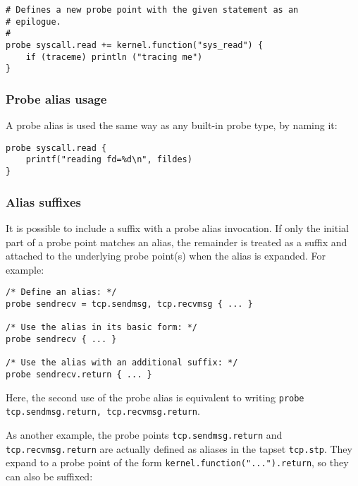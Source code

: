 \documentclass[twoside,english]{article}
\newenvironment{vindent}
{\begin{list}{}{\setlength{\listparindent}{6pt}}
\item[]}
{\end{list}}
\begin{document}
\begin{vindent}
\begin{verbatim}
# Defines a new probe point with the given statement as an
# epilogue.
#
probe syscall.read += kernel.function("sys_read") {
    if (traceme) println ("tracing me")
}
\end{verbatim}
\end{vindent}

\subsubsection{Probe alias usage}

A probe alias is used the same way as any built-in probe type, by
naming it:

\begin{vindent}
\begin{verbatim}
probe syscall.read {
    printf("reading fd=%d\n", fildes)
}
\end{verbatim}
\end{vindent}

\subsubsection{Alias suffixes}

It is possible to include a suffix with a probe alias invocation. If
only the initial part of a probe point matches an alias, the remainder
is treated as a suffix and attached to the underlying probe point(s) when
the alias is expanded. For example:

\begin{vindent}
\begin{verbatim}
/* Define an alias: */
probe sendrecv = tcp.sendmsg, tcp.recvmsg { ... }

/* Use the alias in its basic form: */
probe sendrecv { ... }

/* Use the alias with an additional suffix: */
probe sendrecv.return { ... }
\end{verbatim}
\end{vindent}

Here, the second use of the probe alias is equivalent to writing \verb+probe tcp.sendmsg.return, tcp.recvmsg.return+.

As another example, the probe points \verb+tcp.sendmsg.return+ and \verb+tcp.recvmsg.return+ are actually defined as aliases in the tapset \verb+tcp.stp+. They expand to a probe point of the form \verb+kernel.function("...").return+, so they can also be suffixed:
\end{document}
